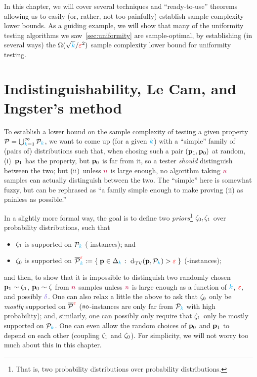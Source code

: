 In this chapter, we will cover several techniques and ``ready-to-use'' theorems allowing us to easily (or, rather, not too painfully) establish sample complexity lower bounds. As a guiding example, we will show that many of the uniformity testing algorithms we saw~\cref{sec:uniformity} are sample-optimal, by establishing (in several ways) the $\Omega(\sqrt{{\textcolor{cyan}{k}}}/\textcolor{red}{\varepsilon}^2)$ sample complexity lower bound for uniformity testing.

\section{Indistinguishability, Le Cam, and Ingster's method}

To establish a lower bound on the sample complexity of testing a given property $\mathcal{P} = \bigcup_{{\textcolor{cyan}{k}}=1}^\infty \mathcal{P}_{\textcolor{cyan}{k}}$, we want to come up (for a given ${\textcolor{cyan}{k}}$) with a ``simple'' family of (pairs of) distributions such that, when chosing such a pair $(\mathbf{p}_1, \mathbf{p}_0)$ at random, (i)~$\mathbf{p}_1$ has the property, but $\mathbf{p}_0$ is far from it, so a tester \emph{should} distinguish between the two; but (ii)~unless ${\textcolor{purple}{n}}$ is large enough, no algorithm taking ${\textcolor{purple}{n}}$ samples can actually distinguish between the two. The ``simple'' here is somewhat fuzzy, but can be rephrased as ``a family simple enough to make proving (ii) as painless as possible.''

In a slightly more formal way, the goal is to define two \emph{priors}\footnote{That is, two probability distributions over probability distributions.} $\zeta_0,\zeta_1$ over probability distributions, such that
\begin{itemize}
	\item $\zeta_1$ is supported on $\mathcal{P}_{\textcolor{cyan}{k}}$ (\yes-instances); and
	\item $\zeta_0$ is supported on $\overline{\property}^{\dst}_\ab \eqdef \setOfSuchThat{\p\in\distribs{\ab}}{\totalvardist{\p}{\property_\ab}>\dst}$ (\no-instances);
\end{itemize}
and then, to show that it is impossible to distinguish two randomly chosen $\mathbf{p}_1\sim \zeta_1$, $\mathbf{p}_0\sim \zeta$ from ${\textcolor{purple}{n}}$ samples unless ${\textcolor{purple}{n}}$ is large enough as a function of ${\textcolor{cyan}{k}}$, $\textcolor{red}{\varepsilon}$, and possibly $\errprob$. One can also relax a little the above to ask that $\zeta_0$ only be \emph{mostly} supported on $\overline{\mathcal{P}}^{\textcolor{red}{\varepsilon}}$ (\ie ${\sf{}no}$-instances are only far from $\mathcal{P}_{\textcolor{cyan}{k}}$ with high probability); and, similarly, one can possibly only require that $\zeta_1$ only be mostly supported on $\mathcal{P}_{\textcolor{cyan}{k}}$. One can even allow the random choices of $\mathbf{p}_0$ and $\mathbf{p}_1$ to depend on each other (\ie coupling $\zeta_1$ and $\zeta_0$). For simplicity, we will not worry too much about this in this chapter.\medskip

